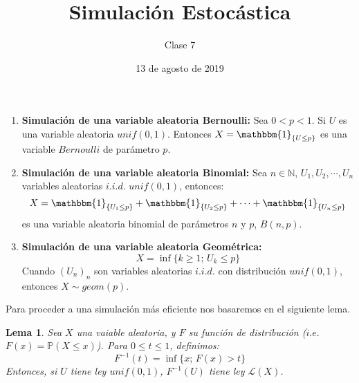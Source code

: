 \documentclass[a4paper]{article}
\title{Simulación Estocástica}
\author{Clase 7}
\date{13 de agosto de 2019}
\newtheorem{lem}{Lema}
\numberwithin{equation}{subsection}
\numberwithin{definicion}{subsection}
\def\N{\mathbb N}
\newcommand{\pb}{\mathbb{P}}
\begin{document}
\maketitle

\begin{enumerate}
    \item \textbf{Simulación de una variable aleatoria Bernoulli:} Sea $0<p<1$. Si $U$ es una variable aleatoria $unif(0,1)$. Entonces $X=\mathbbm{1}_{\{U \leq p\}}$ es una variable $Bernoulli$ de parámetro $p$.
    \item \textbf{Simulación de una variable aleatoria Binomial:} Sea $n\in\N$, $U_1,U_2,\cdots,U_n$ variables aleatorias $i.i.d.$ $unif(0,1)$, entonces:
    \[X=\mathbbm{1}_{\{U_1\leq p\}} + \mathbbm{1}_{\{U_2\leq p\}}+\cdots + \mathbbm{1}_{\{U_n \leq p\}}\]
    es una variable aleatoria binomial de parámetros $n$ y $p$, $B(n,p)$.
    \item \textbf{Simulación de una variable aleatoria Geométrica:}
    \[X = \inf\{k\geq 1;\,U_k\leq p\}\]
    Cuando $(U_n)_n$ son variables aleatorias $i.i.d.$ con distribución $unif(0,1)$, \\entonces $X\sim geom(p)$.
\end{enumerate}
Para proceder a una simulación más eficiente nos basaremos en el siguiente lema.

\begin{lem} Sea $X$ una vaiable aleatoria, y $F$ su función de distribución ($i.e.$ $F(x) = \pb(X\leq x)$). Para $0\leq t\leq 1$, definimos:
\[F^{-1}(t) = \inf\{x;\,F(x)>t\}\]
Entonces, si $U$ tiene ley $unif(0,1)$, $F^{-1}(U)$ tiene ley $\mathcal{L}(X)$.
\end{lem}
\end{document}
